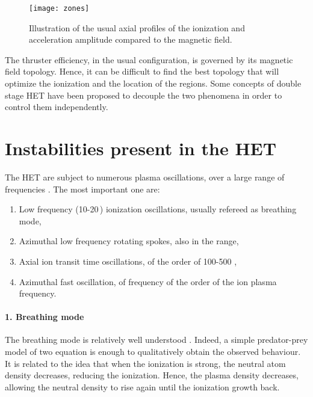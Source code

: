   \begin{figure}[hbtp]
    \centering
    \texttt{[image: zones]}
    \caption{Illustration of the usual axial profiles of the ionization and acceleration amplitude compared to the magnetic field.}
    \label{fig-zones}
  \end{figure}

  The thruster efficiency, in the usual configuration, is governed by its magnetic field topology.
  Hence, it can be difficult to find the best topology that will optimize the ionization and the location of the regions.
  Some concepts of double stage \ac{HET} have been proposed to decouple the two phenomena in order to control them independently.
  

  
  \section*{Instabilities present in the \ac{HET} }
  \label{sec-physics}

  The \ac{HET} are subject to numerous plasma oscillations, over a large range of frequencies \citep{boeuf2017,choueiri2001}.
  The most important one are\string:
  \begin{enumerate}
    \item Low frequency (10-20\,\kilo\hertz) ionization oscillations, usually refereed as breathing mode,
    \item Azimuthal low frequency rotating spokes, also in the \kilo\hertz{} range,
    \item Axial ion transit time oscillations, of the order of 100-500 \kilo\hertz,
    \item Azimuthal fast oscillation, of frequency of the order of the ion plasma frequency.
  \end{enumerate} 

  \paragraph{1. Breathing mode\\}
  The breathing mode is relatively well understood \citep{boeuf1998,barral2009,hara2014}.
  Indeed, a simple predator-prey model of two equation is enough to qualitatively obtain the observed behaviour.
  It is related to the idea that when the ionization is strong, the neutral atom density decreases, reducing the ionization.
  Hence, the plasma density decreases, allowing the neutral density to rise again until the ionization growth back.

